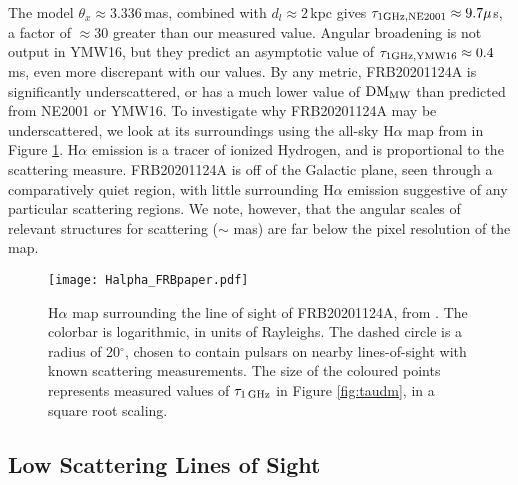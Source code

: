 \documentclass[fleqn,usenatbib]{mnras}
\newcommand{\frb}{FRB20201124A}
\begin{document}
The model $\theta_{x} \approx 3.336\,$mas, combined with $d_{l}\approx 2\,$kpc gives $\tau_{1 \rm GHz, NE2001} \approx 9.7\mu$s, a factor of $\approx 30$ greater than our measured value. Angular broadening is not output in YMW16, but they predict an asymptotic value of $\tau_{1 \rm GHz, YMW16} \approx 0.4\,$ms, even more discrepant with our values.
By any metric, {\frb} is significantly underscattered, or has a much lower value of ${\rm DM}_{\rm MW}$ than predicted from NE2001 or YMW16.  
To investigate why {\frb} may be underscattered, we look at its surroundings using the all-sky H$\alpha$ map from \citet{finkbeiner03} in Figure \ref{fig:halpha}. H$\alpha$ emission is a tracer of ionized Hydrogen, and is proportional to the scattering measure.  {\frb} is off of the Galactic plane, seen through a comparatively quiet region, with little surrounding H$\alpha$ emission suggestive of any particular scattering regions.  We note, however, that the angular scales of relevant structures for scattering ($\sim$ mas) are far below the pixel resolution of the map.

\begin{figure*}
    \centering
    \texttt{[image: Halpha\_FRBpaper.pdf]} \\
    \caption{H$\alpha$ map surrounding the line of sight of {\frb}, from .  The colorbar is logarithmic, in units of Rayleighs. The dashed circle is a radius of 20$^{\circ}$, chosen to contain pulsars on nearby lines-of-sight with known scattering measurements. The size of the coloured points represents measured values of $\tau_{1\,\rm GHz}$ in Figure \ref{fig:taudm}, in a square root scaling.}
    \label{fig:halpha}
\end{figure*}

\subsection{Low Scattering Lines of Sight}
\label{sec:VLBI}
\end{document}
